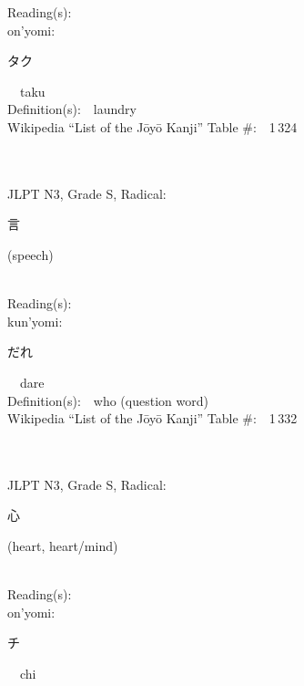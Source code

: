 \begin{multicols}{2}
Reading(s):\ \ \\
{\hspace*{1em}}on'yomi:\ \ \\
{\hspace*{2em}}{\begin{CJK}{UTF8}{min} タク \end{CJK}}\ \ taku\ \ \\
Definition(s):\ \ laundry \\
Wikipedia ``List of the J\=oy\=o Kanji'' Table \#:\ \ 1\,324 \\
\ \ \\
{\fontsize{34pt}{40pt}  }\ \ \\  %
{JLPT N3, Grade S, Radical:\ \ {\begin{CJK}{UTF8}{min} 言 \end{CJK}} (speech) } \\
Reading(s):\ \ \\
{\hspace*{1em}}kun'yomi:\ \ \\
{\hspace*{2em}}{\begin{CJK}{UTF8}{min} だれ \end{CJK}}\ \ dare\ \ \\
Definition(s):\ \ who (question word) \\
Wikipedia ``List of the J\=oy\=o Kanji'' Table \#:\ \ 1\,332 \\
\ \ \\
{\fontsize{34pt}{40pt}  }\ \ \\  %
{JLPT N3, Grade S, Radical:\ \ {\begin{CJK}{UTF8}{min} 心 \end{CJK}} (heart, heart/mind) } \\
Reading(s):\ \ \\
{\hspace*{1em}}on'yomi:\ \ \\
{\hspace*{2em}}{\begin{CJK}{UTF8}{min} チ \end{CJK}}\ \ chi\ \ \\

\end{multicols}
